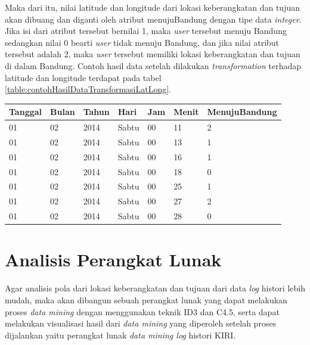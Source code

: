 Maka dari itu, nilai latitude dan longitude dari lokasi keberangkatan dan tujuan akan dibuang dan diganti oleh atribut menujuBandung dengan tipe data \textsl{integer}. Jika isi dari atribut tersebut bernilai 1, maka \textsl{user} tersebut menuju Bandung sedangkan nilai 0 bearti \textsl{user} tidak menuju Bandung, dan jika nilai atribut tersebut adalah 2, maka \textsl{user} tersebut memiliki lokasi keberangkatan dan tujuan di dalam Bandung. Contoh hasil data setelah dilakukan \textsl{transformation} terhadap latitude dan longitude terdapat pada tabel \ref{table:contohHasilDataTransformasiLatLong}.

\begin{table}[H]
\caption{Contoh hasil data transformasi latitude longitude}
\label{table:contohHasilDataTransformasiLatLong}
\begin{longtable}{|l|l|l|l|l|l|l|}
\hline
\textbf{Tanggal}	& \textbf{Bulan}	& \textbf{Tahun} 	& \textbf{Hari} & \textbf{Jam}	& \textbf{Menit} & \textbf{MenujuBandung} \\ \hline
01				         	& 02								& 2014						& Sabtu         & 00         	& 11						 & 2                    \\ \hline
01				         	& 02								& 2014						& Sabtu         & 00         	& 13						 & 1        					  \\ \hline
01				          & 02								& 2014						& Sabtu         & 00         	& 16						 & 1       							\\ \hline
01				          & 02								& 2014						& Sabtu         & 00         	& 18						 & 0         						\\ \hline
01				          & 02								& 2014						& Sabtu         & 00         	& 25						 & 1          					\\ \hline
01				          & 02								& 2014						& Sabtu         & 00         	& 27						 & 2      							\\ \hline
01				          & 02								& 2014						& Sabtu         & 00         	& 28						 & 0       							\\ \hline
\end{longtable}
\end{table} 


\section{Analisis Perangkat Lunak}
Agar analisis pola dari lokasi keberangkatan dan tujuan dari data \textsl{log} histori lebih mudah, maka akan dibangun sebuah perangkat lunak yang dapat melakukan proses \textsl{data mining} dengan menggunakan teknik ID3 dan C4.5, serta dapat melakukan visualisasi hasil dari \textsl{data mining} yang diperoleh setelah proses dijalankan yaitu perangkat lunak \textsl{data mining log} histori KIRI. 


